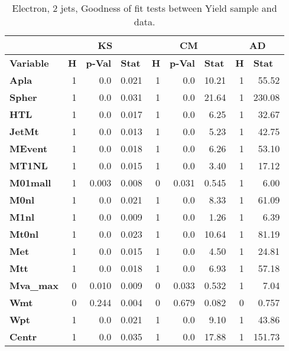 \begin{table}[htbp] \footnotesize
\caption{Electron, 2 jets, Goodness of fit tests between Yield sample and data.}
\begin{center}
\begin{tabular}{|l|r|r|r|r|r|r|r|r|}
\hline
 & \multicolumn{ 3}{c|}{\textbf{KS}} & \multicolumn{ 3}{c|}{\textbf{CM}} & \multicolumn{ 2}{c|}{\textbf{AD}} \\ \hline
\textbf{Variable} & \multicolumn{1}{l|}{\textbf{H}} & \multicolumn{1}{l|}{\textbf{p-Val}} & \multicolumn{1}{l|}{\textbf{Stat}} & \multicolumn{1}{l|}{\textbf{H}} & \multicolumn{1}{l|}{\textbf{p-Val}} & \multicolumn{1}{l|}{\textbf{Stat}} & \multicolumn{1}{l|}{\textbf{H}} & \multicolumn{1}{l|}{\textbf{Stat}} \\ \hline
\textbf{Apla} & 1 & 0.0 & 0.021 & 1 & 0.0 & 10.21 & 1 & 55.52 \\ \hline
\textbf{Spher} & 1 & 0.0 & 0.031 & 1 & 0.0 & 21.64 & 1 & 230.08 \\ \hline
\textbf{HTL} & 1 & 0.0 & 0.017 & 1 & 0.0 & 6.25 & 1 & 32.67 \\ \hline
\textbf{JetMt} & 1 & 0.0 & 0.013 & 1 & 0.0 & 5.23 & 1 & 42.75 \\ \hline
\textbf{MEvent} & 1 & 0.0 & 0.018 & 1 & 0.0 & 6.26 & 1 & 53.10 \\ \hline
\textbf{MT1NL} & 1 & 0.0 & 0.015 & 1 & 0.0 & 3.40 & 1 & 17.12 \\ \hline
\textbf{M01mall} & 1 & 0.003 & 0.008 & 0 & 0.031 & 0.545 & 1 & 6.00 \\ \hline
\textbf{M0nl} & 1 & 0.0 & 0.021 & 1 & 0.0 & 8.33 & 1 & 61.09 \\ \hline
\textbf{M1nl} & 1 & 0.0 & 0.009 & 1 & 0.0 & 1.26 & 1 & 6.39 \\ \hline
\textbf{Mt0nl} & 1 & 0.0 & 0.023 & 1 & 0.0 & 10.64 & 1 & 81.19 \\ \hline
\textbf{Met} & 1 & 0.0 & 0.015 & 1 & 0.0 & 4.50 & 1 & 24.81 \\ \hline
\textbf{Mtt} & 1 & 0.0 & 0.018 & 1 & 0.0 & 6.93 & 1 & 57.18 \\ \hline
\textbf{Mva\_max} & 0 & 0.010 & 0.009 & 0 & 0.033 & 0.532 & 1 & 7.04 \\ \hline
\textbf{Wmt} & 0 & 0.244 & 0.004 & 0 & 0.679 & 0.082 & 0 & 0.757 \\ \hline
\textbf{Wpt} & 1 & 0.0 & 0.021 & 1 & 0.0 & 9.10 & 1 & 43.86 \\ \hline
\textbf{Centr} & 1 & 0.0 & 0.035 & 1 & 0.0 & 17.88 & 1 & 151.73 \\ \hline

\end{tabular}
\end{center}
\end{table}
